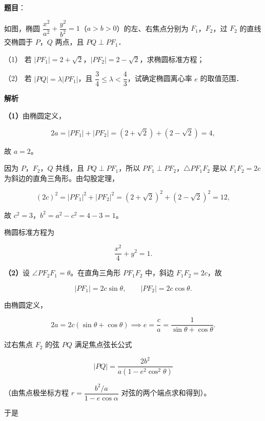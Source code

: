 \begin{answer}

\textbf{题目}：

如图，椭圆 $\dfrac{x^{2}}{a^{2}}+\dfrac{y^{2}}{b^{2}}=1$（$a>b>0$）的左、右焦点分别为 $F_{1}$，$F_{2}$，过 $F_{2}$ 的直线交椭圆于 $P$，$Q$ 两点，且 $PQ\perp PF_{1}$．

（1） 若 $|PF_{1}|=2+\sqrt{2}$，$|PF_{2}|=2-\sqrt{2}$，求椭圆标准方程；

（2） 若 $|PQ|=\lambda|PF_{1}|$，且 $\dfrac{3}{4}\le\lambda<\dfrac{4}{3}$，试确定椭圆离心率 $e$ 的取值范围．
\nopagebreak[4]
\begin{center}\end{center}
\nopagebreak[4]
\textbf{解析}

\textbf{（1）}由椭圆定义，

\nopagebreak[4]
\[
2a=|PF_{1}|+|PF_{2}|=(2+\sqrt{2})+(2-\sqrt{2})=4,
\]

故 $a=2$。

因为 $P$，$F_{2}$，$Q$ 共线，且 $PQ\perp PF_{1}$，所以 $PF_{1}\perp PF_{2}$，$\triangle PF_{1}F_{2}$ 是以 $F_{1}F_{2}=2c$ 为斜边的直角三角形。由勾股定理，

\nopagebreak[4]
\[
(2c)^{2}=|PF_{1}|^{2}+|PF_{2}|^{2}
=(2+\sqrt{2})^{2}+(2-\sqrt{2})^{2}=12,
\]

故 $c^{2}=3$，$b^{2}=a^{2}-c^{2}=4-3=1$。

椭圆标准方程为

\nopagebreak[4]
\[
\frac{x^{2}}{4}+y^{2}=1.
\]

\textbf{（2）}设 $\angle PF_{2}F_{1}=\theta$。在直角三角形 $PF_{1}F_{2}$ 中，斜边 $F_{1}F_{2}=2c$，故

\nopagebreak[4]
\[
|PF_{1}|=2c\sin\theta,\qquad |PF_{2}|=2c\cos\theta.
\]

由椭圆定义，

\nopagebreak[4]
\[
2a=2c(\sin\theta+\cos\theta)
\implies
e=\frac{c}{a}=\frac{1}{\sin\theta+\cos\theta}.
\]

过右焦点 $F_{2}$ 的弦 $PQ$ 满足焦点弦长公式

\nopagebreak[4]
\[
|PQ|=\frac{2b^{2}}{a(1-e^{2}\cos^{2}\theta)}
\]

（由焦点极坐标方程 $r=\dfrac{b^{2}/a}{1-e\cos\alpha}$ 对弦的两个端点求和得到）。

于是


\end{answer}
